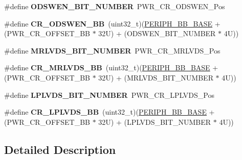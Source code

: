 \begin{DoxyCompactItemize}
\#define {\bfseries O\+D\+S\+W\+E\+N\+\_\+\+B\+I\+T\+\_\+\+N\+U\+M\+B\+ER}~P\+W\+R\+\_\+\+C\+R\+\_\+\+O\+D\+S\+W\+E\+N\+\_\+\+Pos
\item 
\mbox{\label{group___p_w_r_ex__register__alias__address_ga4915f7ce72ac67213c7a5b50bce70d54}} 
\#define {\bfseries C\+R\+\_\+\+O\+D\+S\+W\+E\+N\+\_\+\+BB}~(uint32\+\_\+t)(\hyperlink{group___peripheral__memory__map_gaed7efc100877000845c236ccdc9e144a}{P\+E\+R\+I\+P\+H\+\_\+\+B\+B\+\_\+\+B\+A\+SE} + (P\+W\+R\+\_\+\+C\+R\+\_\+\+O\+F\+F\+S\+E\+T\+\_\+\+BB $\ast$ 32\+U) + (\+O\+D\+S\+W\+E\+N\+\_\+\+B\+I\+T\+\_\+\+N\+U\+M\+B\+E\+R $\ast$ 4\+U))
\item 
\mbox{\label{group___p_w_r_ex__register__alias__address_ga28a0fb2b4631ef67fa151764489fbf24}} 
\#define {\bfseries M\+R\+L\+V\+D\+S\+\_\+\+B\+I\+T\+\_\+\+N\+U\+M\+B\+ER}~P\+W\+R\+\_\+\+C\+R\+\_\+\+M\+R\+L\+V\+D\+S\+\_\+\+Pos
\item 
\mbox{\label{group___p_w_r_ex__register__alias__address_ga07027fcac2bdf595eaf9d0933fbdaeec}} 
\#define {\bfseries C\+R\+\_\+\+M\+R\+L\+V\+D\+S\+\_\+\+BB}~(uint32\+\_\+t)(\hyperlink{group___peripheral__memory__map_gaed7efc100877000845c236ccdc9e144a}{P\+E\+R\+I\+P\+H\+\_\+\+B\+B\+\_\+\+B\+A\+SE} + (P\+W\+R\+\_\+\+C\+R\+\_\+\+O\+F\+F\+S\+E\+T\+\_\+\+BB $\ast$ 32\+U) + (\+M\+R\+L\+V\+D\+S\+\_\+\+B\+I\+T\+\_\+\+N\+U\+M\+B\+E\+R $\ast$ 4\+U))
\item 
\mbox{\label{group___p_w_r_ex__register__alias__address_ga275a1c9f059c6d03973211a12b88311f}} 
\#define {\bfseries L\+P\+L\+V\+D\+S\+\_\+\+B\+I\+T\+\_\+\+N\+U\+M\+B\+ER}~P\+W\+R\+\_\+\+C\+R\+\_\+\+L\+P\+L\+V\+D\+S\+\_\+\+Pos
\item 
\mbox{\label{group___p_w_r_ex__register__alias__address_gadf91aa0d2f93b4cc91f2f6ca82200faf}} 
\#define {\bfseries C\+R\+\_\+\+L\+P\+L\+V\+D\+S\+\_\+\+BB}~(uint32\+\_\+t)(\hyperlink{group___peripheral__memory__map_gaed7efc100877000845c236ccdc9e144a}{P\+E\+R\+I\+P\+H\+\_\+\+B\+B\+\_\+\+B\+A\+SE} + (P\+W\+R\+\_\+\+C\+R\+\_\+\+O\+F\+F\+S\+E\+T\+\_\+\+BB $\ast$ 32\+U) + (\+L\+P\+L\+V\+D\+S\+\_\+\+B\+I\+T\+\_\+\+N\+U\+M\+B\+E\+R $\ast$ 4\+U))
\end{DoxyCompactItemize}


\subsection{Detailed Description}
